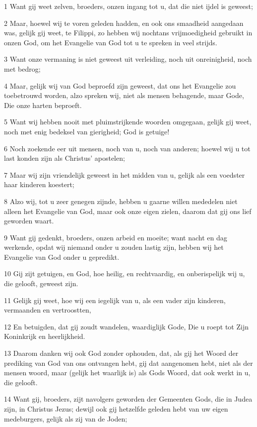 \par 1 Want gij weet zelven, broeders, onzen ingang tot u, dat die niet ijdel is geweest;
\par 2 Maar, hoewel wij te voren geleden hadden, en ook ons smaadheid aangedaan was, gelijk gij weet, te Filippi, zo hebben wij nochtans vrijmoedigheid gebruikt in onzen God, om het Evangelie van God tot u te spreken in veel strijds.
\par 3 Want onze vermaning is niet geweest uit verleiding, noch uit onreinigheid, noch met bedrog;
\par 4 Maar, gelijk wij van God beproefd zijn geweest, dat ons het Evangelie zou toebetrouwd worden, alzo spreken wij, niet als mensen behagende, maar Gode, Die onze harten beproeft.
\par 5 Want wij hebben nooit met pluimstrijkende woorden omgegaan, gelijk gij weet, noch met enig bedeksel van gierigheid; God is getuige!
\par 6 Noch zoekende eer uit mensen, noch van u, noch van anderen; hoewel wij u tot last konden zijn als Christus' apostelen;
\par 7 Maar wij zijn vriendelijk geweest in het midden van u, gelijk als een voedster haar kinderen koestert;
\par 8 Alzo wij, tot u zeer genegen zijnde, hebben u gaarne willen mededelen niet alleen het Evangelie van God, maar ook onze eigen zielen, daarom dat gij ons lief geworden waart.
\par 9 Want gij gedenkt, broeders, onzen arbeid en moeite; want nacht en dag werkende, opdat wij niemand onder u zouden lastig zijn, hebben wij het Evangelie van God onder u gepredikt.
\par 10 Gij zijt getuigen, en God, hoe heilig, en rechtvaardig, en onberispelijk wij u, die gelooft, geweest zijn.
\par 11 Gelijk gij weet, hoe wij een iegelijk van u, als een vader zijn kinderen, vermaanden en vertroostten,
\par 12 En betuigden, dat gij zoudt wandelen, waardiglijk Gode, Die u roept tot Zijn Koninkrijk en heerlijkheid.
\par 13 Daarom danken wij ook God zonder ophouden, dat, als gij het Woord der prediking van God van ons ontvangen hebt, gij dat aangenomen hebt, niet als der mensen woord, maar (gelijk het waarlijk is) als Gods Woord, dat ook werkt in u, die gelooft.
\par 14 Want gij, broeders, zijt navolgers geworden der Gemeenten Gods, die in Judea zijn, in Christus Jezus; dewijl ook gij hetzelfde geleden hebt van uw eigen medeburgers, gelijk als zij van de Joden;
